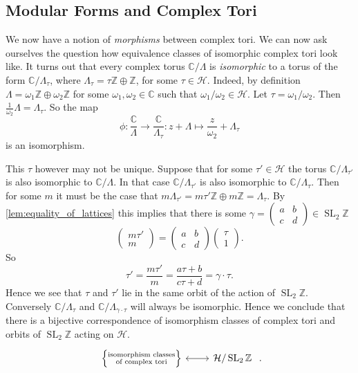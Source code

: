 \documentclass[titlepage,a4paper]{article}
\theoremstyle{theoremdd}
\theoremstyle{definitiondd}
\theoremstyle{remarkdd}
\newcommand{\Z}{\mathbb{Z}}
\newcommand{\C}{\mathbb{C}}
\DeclareMathOperator{\SL}{SL}
\begin{document}
\subsection{Modular Forms and Complex Tori} \label{sec:modular_forms_and_complex_tori}
We now have a notion of \emph{morphisms} between complex tori. We can now ask ourselves the question how equivalence classes of isomorphic complex tori look like.
It turns out that every complex torus $\C / \Lambda$ is \emph{isomorphic} to a torus of the form $\C / \Lambda_\tau$, where $\Lambda_\tau = \tau \Z \oplus \Z$, for some $\tau \in  \mathcal{H}$. 
Indeed, by definition $\Lambda = \omega_1 \Z \oplus \omega_2 \Z$ for some $\omega_1, \omega_2 \in \C$ such that $\omega_1 / \omega_2 \in \mathcal{H} $. Let $\tau = \omega_1 / \omega_2$. 
Then $\frac{1}{\omega_2} \Lambda = \Lambda_\tau$. 
So the map  \[
\phi: \frac{\C}{ \Lambda} \to \frac{\C}{\Lambda_\tau}: z + \Lambda \mapsto \frac{z}{\omega_2} + \Lambda_\tau
\]
is an isomorphism.

This $\tau$ however may not be unique. Suppose that for some $\tau' \in \mathcal{H} $ the torus $\C / \Lambda_{\tau'}$ is also isomorphic to $\C / \Lambda$. 
In that case $\C / \Lambda_{\tau'}$ is also isomorphic to $\C / \Lambda_{\tau}$. 
Then for some $m$ it must be the case that $m \Lambda_{\tau'} = m\tau' \Z \oplus m \Z = \Lambda_\tau$. 
By \cref{lem:equality_of_lattices} this implies that there is some $\gamma = \begin{pmatrix} a & b \\ c& d \end{pmatrix}  \in \SL_2\Z$ \[
\begin{pmatrix} m\tau' \\ m \end{pmatrix}  = \begin{pmatrix} a & b \\ c& d \end{pmatrix}  \begin{pmatrix} \tau \\ 1 \end{pmatrix} 
.\] 
So \[
\tau' = \frac{m \tau'}{m} = \frac{a \tau + b}{c \tau + d} = \gamma\cdot \tau
.\] 
Hence we see that $\tau$ and $\tau'$ lie in the same orbit of the action of $\SL_2\Z$. 
Conversely $\C / \Lambda_\tau$ and $\C / \Lambda_{\gamma\cdot \tau}$ will always be isomorphic.
Hence we conclude that there is a bijective correspondence of isomorphism classes of complex tori and orbits of $\SL_2\Z$ acting on $\mathcal{H} $.\[
\begin{tikzcd}
	\left\{ \substack{\text{isomorphism classes} \\ \text{of complex tori}} \right\} \arrow[r, leftrightarrow] & 
	\mathcal{H} / \SL_2\Z\ 
\end{tikzcd}
.\] 
\end{document}
